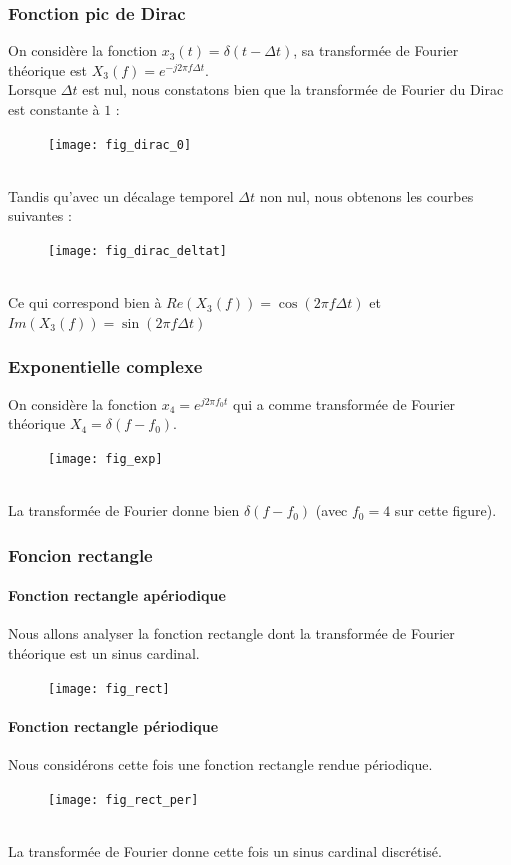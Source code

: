 \documentclass{article}
\begin{document}
\subsubsection{Fonction pic de Dirac}
On considère la fonction $x_3(t)=\delta(t-\Delta t)$, sa transformée de Fourier théorique est $X_3(f)=e^{-j2\pi f\Delta t}$. \\
Lorsque $\Delta t$ est nul, nous constatons bien que la transformée de Fourier du Dirac est constante à $1$ :
\begin{figure}[h]
\texttt{[image: fig\_dirac\_0]}
\centering
\end{figure} \\
Tandis qu'avec un décalage temporel $\Delta t$ non nul, nous obtenons les courbes suivantes :
\begin{figure}[h]
\texttt{[image: fig\_dirac\_deltat]}
\centering
\end{figure} \\
Ce qui correspond bien à $Re(X_3(f))=\cos(2\pi f\Delta t)$ et $Im(X_3(f))=\sin(2\pi f\Delta t)$

\subsubsection{Exponentielle complexe}
On considère la fonction $x_4=e^{j2\pi f_0 t}$ qui a comme transformée de Fourier théorique $X_4=\delta(f-f_0)$.
\begin{figure}[h]
\texttt{[image: fig\_exp]}
\centering
\end{figure} \\
La transformée de Fourier donne bien $\delta(f-f_0)$ (avec $f_0=4$ sur cette figure).

\subsubsection{Foncion rectangle}
\paragraph{Fonction rectangle apériodique}
Nous allons analyser la fonction rectangle dont la transformée de Fourier théorique est un sinus cardinal.
\begin{figure}[h]
\texttt{[image: fig\_rect]}
\centering
\end{figure}
\paragraph{Fonction rectangle périodique}
Nous considérons cette fois une fonction rectangle rendue périodique.
\begin{figure}[h]
\texttt{[image: fig\_rect\_per]}
\centering
\end{figure} \\
La transformée de Fourier donne cette fois un sinus cardinal discrétisé.
\end{document}
